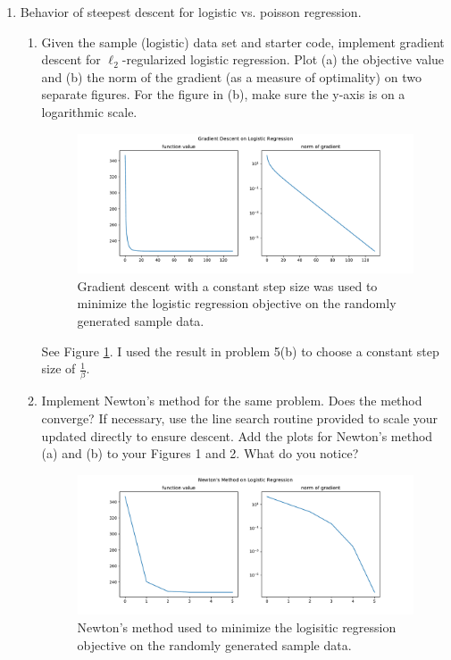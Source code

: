 \documentclass[11pt]{amsart}
\begin{document}
\begin{enumerate}
\bigskip\bigskip

\item Behavior of steepest descent for logistic vs. poisson regression. 
\begin{enumerate}
\item Given the sample (logistic) data set and starter code, implement gradient descent for $\ell_2$-regularized logistic regression. 
Plot (a) the objective value and (b) the norm of the gradient 
(as a measure of optimality) on two separate figures. For the figure in (b), make sure the y-axis is on a logarithmic scale.

\begin{figure}
  \centering
  \includegraphics[width=\textwidth]{logistic_gradient_descent.pdf}
  \caption{Gradient descent with a constant step size was used to minimize the
    logistic regression objective on the randomly generated sample data.}
  \label{fig:logistic_gradient_descent}
\end{figure}

See Figure \ref{fig:logistic_gradient_descent}. I used the result in problem
5(b) to choose a constant step size of $\frac{1}{\beta}$.

    
\item Implement Newton's method for the same problem. Does the method converge? If necessary, use the line search routine provided
  to scale your updated directly to ensure descent. Add the plots for Newton's method (a) and (b) to your Figures 1 and 2. What do you notice?

  \begin{figure}
    \centering
    \includegraphics[width=\textwidth]{logistic_newton.pdf}
    \caption{Newton's method used to minimize the logisitic regression objective
      on the randomly generated sample data.}
    \label{fig:logistic_newton}
  \end{figure}


\end{enumerate}
\end{enumerate}
\end{document}
